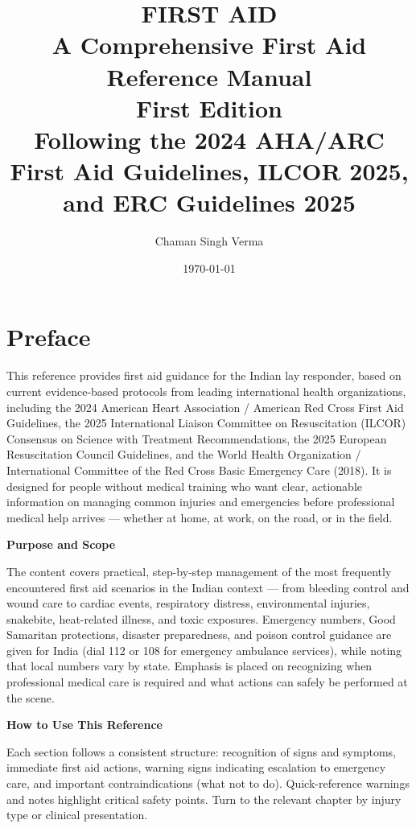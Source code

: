 \documentclass[12pt]{book}
\title{\textbf{\Huge FIRST AID}\\[1em]\Large A Comprehensive First Aid Reference Manual\\[0.5em]\small First Edition\\[0.3em]\small Following the 2024 AHA/ARC First Aid Guidelines, ILCOR 2025, and ERC Guidelines 2025}
\author{Chaman Singh Verma}
\date{\today}
\begin{document}
\frontmatter
\maketitle

\setcounter{tocdepth}{1}
\tableofcontents

\clearpage

\section*{Preface}

This reference provides first aid guidance for the Indian lay responder, based on current evidence-based protocols from leading international health organizations, including the 2024 American Heart Association / American Red Cross First Aid Guidelines, the 2025 International Liaison Committee on Resuscitation (ILCOR) Consensus on Science with Treatment Recommendations, the 2025 European Resuscitation Council Guidelines, and the World Health Organization / International Committee of the Red Cross Basic Emergency Care (2018). It is designed for people without medical training who want clear, actionable information on managing common injuries and emergencies before professional medical help arrives — whether at home, at work, on the road, or in the field.

\textbf{Purpose and Scope}

The content covers practical, step-by-step management of the most frequently encountered first aid scenarios in the Indian context — from bleeding control and wound care to cardiac events, respiratory distress, environmental injuries, snakebite, heat-related illness, and toxic exposures. Emergency numbers, Good Samaritan protections, disaster preparedness, and poison control guidance are given for India (dial 112 or 108 for emergency ambulance services), while noting that local numbers vary by state. Emphasis is placed on recognizing when professional medical care is required and what actions can safely be performed at the scene.

\textbf{How to Use This Reference}

Each section follows a consistent structure: recognition of signs and symptoms, immediate first aid actions, warning signs indicating escalation to emergency care, and important contraindications (what not to do). Quick-reference warnings and notes highlight critical safety points. Turn to the relevant chapter by injury type or clinical presentation.
\end{document}
